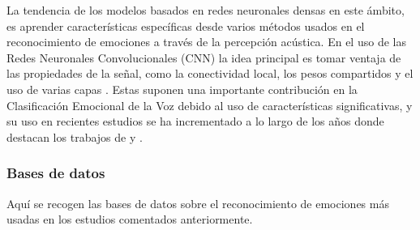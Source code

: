 \documentclass[11pt,a4paper,spanish]{book}
\begin{document}
	La tendencia de los modelos basados en redes neuronales densas en este ámbito, es aprender características específicas desde varios métodos usados en el reconocimiento de emociones a través de la percepción acústica. En el uso de las Redes Neuronales Convolucionales (CNN) la idea principal es tomar ventaja de las propiedades de la señal, como la conectividad local, los pesos compartidos y el uso de varias capas  \cite{Lim2017}. Estas suponen una importante contribución en la Clasificación Emocional de la Voz debido al uso de características significativas, y su uso en recientes estudios se ha incrementado a lo largo de los años donde destacan los trabajos de \cite{AbdulQayyum2019} y \cite{Anvarjon2020}.  %
	
	\subsubsection{Bases de datos}
	\label{lb:cap_baseDatos}
	Aquí se recogen las bases de datos sobre el reconocimiento de emociones más usadas en los estudios comentados anteriormente.
	
\end{document}
